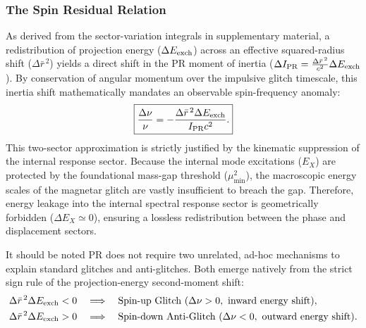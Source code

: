 \documentclass[11pt]{article}
\begin{document}
\subsubsection{The Spin Residual Relation}
As derived from the sector-variation integrals in supplementary material, a redistribution of projection energy ($\Delta E_{\rm exch}$) across an effective squared-radius shift ($\Delta\bar r^{\,2}$) yields a direct shift in the PR moment of inertia ($\Delta I_{\rm PR} = \frac{\Delta\bar r^{\,2}}{c^2}\Delta E_{\rm exch}$). By conservation of angular momentum over the impulsive glitch timescale, this inertia shift mathematically mandates an observable spin-frequency anomaly:
\begin{equation}
\boxed{
\frac{\Delta\nu}{\nu}
=
-
\frac{
\Delta\bar r^{\,2}\Delta E_{\rm exch}
}{
I_{\rm PR}c^2
}.
}
\end{equation}
This two-sector approximation is strictly justified by the kinematic suppression of the internal response sector. Because the internal mode excitations ($E_X$) are protected by the foundational mass-gap threshold ($\mu_{\min}^2$), the macroscopic energy scales of the magnetar glitch are vastly insufficient to breach the gap. Therefore, energy leakage into the internal spectral response sector is geometrically forbidden ($\Delta E_X \simeq 0$), ensuring a lossless redistribution between the phase and displacement sectors.

It should be noted PR does not require two unrelated, ad-hoc mechanisms to explain standard glitches and anti-glitches. Both emerge natively from the strict sign rule of the projection-energy second-moment shift:
\begin{align}
\Delta\bar r^{\,2}\Delta E_{\rm exch}<0
\quad
&\Longrightarrow
\quad
\text{Spin-up Glitch } (\Delta\nu>0, \text{ inward energy shift}),
\\
\Delta\bar r^{\,2}\Delta E_{\rm exch}>0
\quad
&\Longrightarrow
\quad
\text{Spin-down Anti-Glitch } (\Delta\nu<0, \text{ outward energy shift}).
\end{align}
\end{document}
